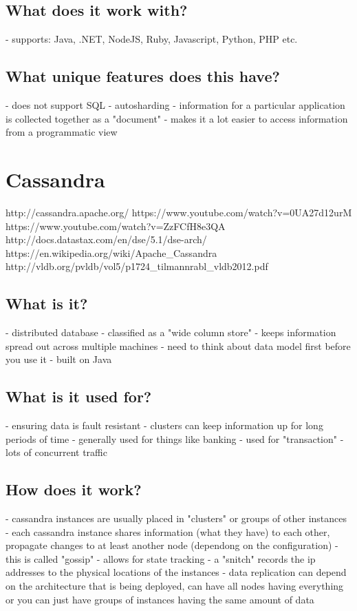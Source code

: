 \section{What does it work with?}
- supports: Java, .NET, NodeJS, Ruby, Javascript, Python, PHP etc.

\section{What unique features does this have?}
- does not support SQL
- autosharding
- information for a particular application is collected together as a "document" - makes it a lot easier to access information from a programmatic view

\chapter{Cassandra}
http://cassandra.apache.org/
https://www.youtube.com/watch?v=0UA27d12urM
https://www.youtube.com/watch?v=ZzFCfH8e3QA
http://docs.datastax.com/en/dse/5.1/dse-arch/
https://en.wikipedia.org/wiki/Apache_Cassandra
http://vldb.org/pvldb/vol5/p1724_tilmannrabl_vldb2012.pdf

\section{What is it?}
- distributed database - classified as a "wide column store"
- keeps information spread out across multiple machines
- need to think about data model first before you use it
- built on Java

\section{What is it used for?}
- ensuring data is fault resistant
- clusters can keep information up for long periods of time
- generally used for things like banking
- used for "transaction" - lots of concurrent traffic

\section{How does it work?}
- cassandra instances are usually placed in "clusters" or groups of other instances
- each cassandra instance shares information (what they have) to each other, propagate changes to at least another node (dependong on the configuration) - this is called "gossip" - allows for state tracking
- a "snitch" records the ip addresses to the physical locations of the instances
- data replication can depend on the architecture that is being deployed, can have all nodes having everything or you can just have groups of instances having the same amount of data


